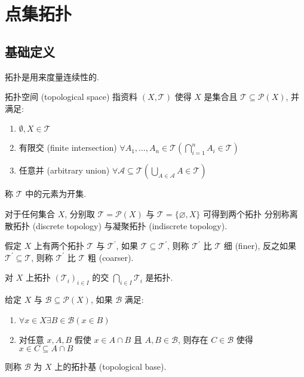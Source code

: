 \section{点集拓扑}

\subsection{基础定义}

拓扑是用来度量连续性的.

\begin{definition}[拓扑空间]
    拓扑空间 (topological space) 指资料 \((X,\mathcal{T})\) 使得 \(X\) 是集合且 \(\mathcal{T} \subseteq \mathcal{P}(X)\), 并满足:
    \begin{enumerate}
        \item \(\emptyset, X \in \mathcal{T}\)
        \item 有限交 (finite intersection) \(\forall A_1, \dots, A_n \in \mathcal{T} (\bigcap_{i=1}^n A_i \in \mathcal{T})\)
        \item 任意并 (arbitrary union) \(\forall \mathcal{A} \subseteq \mathcal{T} (\bigcup_{A \in \mathcal{A}} A \in \mathcal{T})\)
    \end{enumerate}
    称 \(\mathcal{T}\) 中的元素为开集.
\end{definition}

\begin{definition}
    对于任何集合 \(X\), 分别取 \(\mathcal{T} = \mathcal{P} (X)\) 与 \(\mathcal{T} = \{\varnothing,X\}\) 可得到两个拓扑
    分别称离散拓扑 (discrete topology) 与凝聚拓扑 (indiscrete topology).
\end{definition}

\begin{definition}
    假定 \(X\) 上有两个拓扑 \(\mathcal{T}\) 与 \(\mathcal{T}^\prime\), 如果 \(\mathcal{T} \subseteq \mathcal{T}^\prime\), 则称 \(\mathcal{T}^\prime\) 比 \(\mathcal{T}\) 细 (finer),
    反之如果 \(\mathcal{T}^\prime \subseteq \mathcal{T}\), 则称 \(\mathcal{T}^\prime\) 比 \(\mathcal{T}\) 粗 (coarser).
\end{definition}

\begin{lemma}
    对 \(X\) 上拓扑 \({(\mathcal{T}_i)}_{i \in I}\) 的交 \(\bigcap_{i \in I} \mathcal{T}_i\) 是拓扑.
\end{lemma}

\begin{definition}[拓扑基]
    给定 \(X\) 与 \(\mathcal{B} \subseteq \mathcal{P}(X)\), 如果 \(\mathcal{B}\) 满足:
    \begin{enumerate}
        \item \(\forall x \in X \exists B \in \mathcal{B} (x \in B)\)
        \item 对任意 \(x,A,B\) 假使 \(x \in A \cap B\) 且 \(A,B \in \mathcal{B}\), 则存在 \(C \in \mathcal{B}\) 使得 \(x \in C \subseteq A \cap B\)
    \end{enumerate}
    则称 \(\mathcal{B}\) 为 \(X\) 上的拓扑基 (topological base).
\end{definition}

